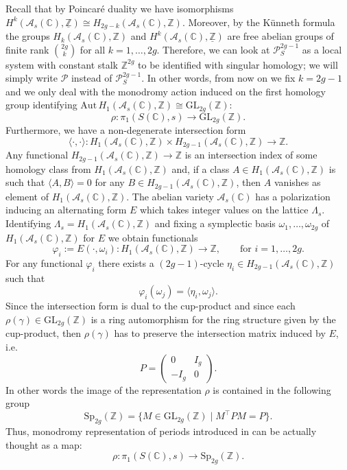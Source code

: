 \documentclass[10 pt,a4paper]{article}
\theoremstyle{plain}
\theoremstyle{definition}
\theoremstyle{named}
\newcommand{\cA}{\mathcal A}
\newcommand{\bC}{\mathbb C}
\newcommand{\cP}{\mathcal P}
\newcommand{\bZ}{\mathbb Z}
\begin{document}

Recall that by Poincar\'e duality we have isomorphisms $H^k(\cA_s(\bC),\underline{\bZ}) \cong H_{2g-k}(\cA_s(\bC),\bZ)$. Moreover, by the K\"unneth formula the groups $H_k(\cA_s(\bC),\bZ)$ and $H^k(\cA_s(\bC),\underline{\bZ})$ are free abelian groups of finite rank $\binom{2g}{k}$ for all $k = 1, \ldots, 2g$. Therefore, we can look at $\cP_S^{2g-1}$ as a local system with constant stalk $\bZ^{2g}$ to be identified with singular homology; we will simply write $\cP$ instead of $\cP_S^{2g-1}$. In other words, from now on we fix $k=2g-1$ and we only deal with the monodromy action induced on the first homology group identifying $\textrm{Aut}\,H_1(\cA_s(\bC),\bZ) \cong \textrm{GL}_{2g}(\bZ)$:
\[
\rho:\pi_1(S(\bC),s) \to \textrm{GL}_{2g}(\bZ).
\]
Furthermore, we have a non-degenerate intersection form
\[
\langle\cdot, \cdot\rangle: H_1(\cA_s(\bC),\bZ) \times H_{2g-1}(\cA_s(\bC),\bZ) \to \bZ.
\]
Any functional $H_{2g-1}(\cA_s(\bC),\bZ) \to \bZ$ is an intersection index of some homology class from $H_1(\cA_s(\bC),\bZ)$ and, if a class $A \in H_1(\cA_s(\bC),\bZ)$ is such that $\langle A,B \rangle = 0$ for any $B \in H_{2g-1}(\cA_s(\bC),\bZ)$, then $A$ vanishes as element of $H_1(\cA_s(\bC),\bZ)$. The abelian variety $\cA_s(\bC)$ has a polarization inducing an alternating form $E$ which takes integer values on the lattice $\Lambda_s$. Identifying $\Lambda_s=H_1(\cA_s(\bC),\bZ)$ and fixing a symplectic basis $\omega_1, \ldots, \omega_{2g}$ of $H_1(\cA_s(\bC),\bZ)$ for $E$ we obtain functionals
\[
\varphi_i:=E(\cdot,\omega_i):H_1(\cA_s(\bC),\bZ) \to \bZ, \qquad \textrm{for } i =1, \ldots, 2g.
\]
For any functional $\varphi_i$ there exists a $(2g-1)$-cycle $\eta_i \in H_{2g-1}(\cA_s(\bC),\bZ)$ such that
\[
\varphi_i(\omega_j)=\langle \eta_i,\omega_j \rangle.
\]
Since the intersection form is dual to the cup-product and since each $\rho(\gamma) \in \textrm{GL}_{2g}(\bZ)$ is a ring automorphism for the ring structure given by the cup-product, then $\rho(\gamma)$ has to preserve the intersection matrix induced by $E$, i.e.
\[
P=
\begin{pmatrix}
    0 & I_g\\
    -I_g & 0
\end{pmatrix}.
\]
In other words the image of the representation $\rho$ is contained in the following group
\[
\textrm{Sp}_{2g}(\bZ)=\{M \in \textrm{GL}_{2g}(\bZ) \mid M^\top PM=P\}.
\]
Thus, monodromy representation of periods introduced in  can be actually thought as a map:
\begin{equation}\label{monPer}
    \rho: \pi_1(S(\bC),s) \to \textrm{Sp}_{2g}(\bZ).
\end{equation}
\end{document}
